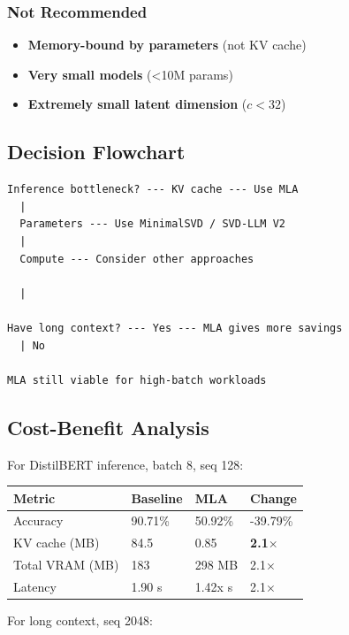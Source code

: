 \subsubsection{Not Recommended}

\begin{itemize}
\item \textbf{Memory-bound by parameters} (not KV cache)
\item \textbf{Very small models} (\textless{}10M params)
\item \textbf{Extremely small latent dimension} ($c < 32$)

\end{itemize}
\subsection{Decision Flowchart}

\begin{lstlisting}
Inference bottleneck? --- KV cache --- Use MLA
  |
  Parameters --- Use MinimalSVD / SVD-LLM V2
  |
  Compute --- Consider other approaches

  |
   
Have long context? --- Yes --- MLA gives more savings
  | No
   
MLA still viable for high-batch workloads
\end{lstlisting}

\subsection{Cost-Benefit Analysis}

For DistilBERT inference, batch 8, seq 128:

\begin{table}[H]
\centering
\small
\begin{tabular}{llll}
\toprule
\textbf{Metric} & \textbf{Baseline} & \textbf{MLA} & \textbf{Change} \\
\midrule
Accuracy & 90.71\% & 50.92\% & -39.79\% \\
KV cache (MB) & 84.5 & 0.85 & \textbf{2.1$\times$} \\
Total VRAM (MB) & 183 & 298 MB & 2.1$\times$ \\
Latency & 1.90 s & 1.42x s & 2.1$\times$ \\
\bottomrule
\end{tabular}
\end{table}

For long context, seq 2048:

